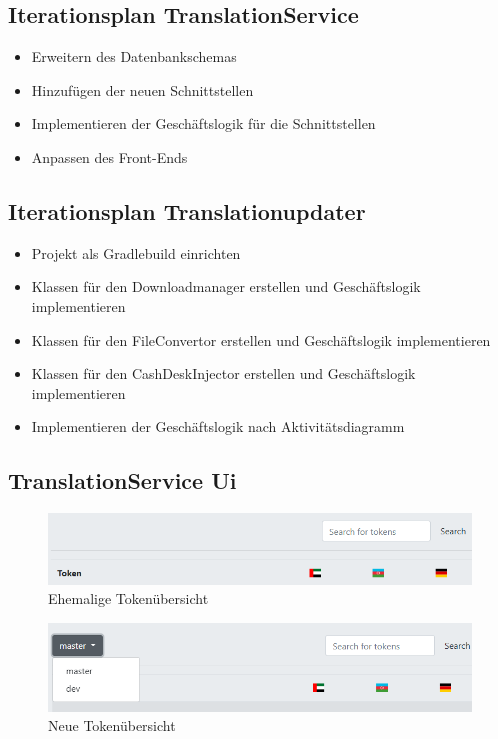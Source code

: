 \documentclass[10pt, oneside, ngerman]{article}
\begin{document}
  \subsection{Iterationsplan TranslationService}\label{sec:iterationplan:tr}
  \begin{itemize}
    \item Erweitern des Datenbankschemas
    \item Hinzufügen der neuen Schnittstellen
    \item Implementieren der Geschäftslogik für die Schnittstellen
    \item Anpassen des Front-Ends
  \end{itemize}
  \subsection{Iterationsplan Translationupdater}\label{sec:iterationplan:tu}
  \begin{itemize}
    \item Projekt als Gradlebuild einrichten
    \item Klassen für den Downloadmanager erstellen und Geschäftslogik implementieren
    \item Klassen für den FileConvertor erstellen und Geschäftslogik implementieren
    \item Klassen für den CashDeskInjector erstellen und Geschäftslogik implementieren
    \item Implementieren der Geschäftslogik nach Aktivitätsdiagramm
  \end{itemize}
  \newpage
  \subsection{TranslationService Ui}\label{sec:impl:ui}
  \begin{figure}[htb]
    \centering
    \includegraphics[width=\textwidth]{TR_UI_TOKENS_OLD.png}
    \caption{Ehemalige Tokenübersicht }
  \end{figure}
  \begin{figure}[htb]
    \centering
    \includegraphics[width=\textwidth]{TR_UI_TOKENS_NEW.png}
    \caption{Neue Tokenübersicht }
  \end{figure}
  \newpage
\end{document}
